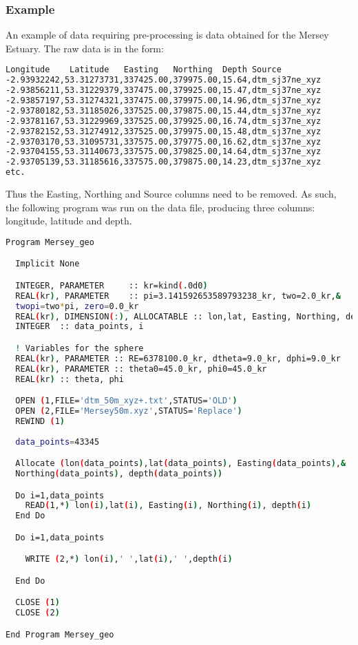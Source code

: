 \subsubsection{Example}

An example of data requiring pre-processing is data obtained for the Mersey Estuary. The raw data is in the form:
\begin{lstlisting}[language = Bash]
Longitude    Latitude   Easting   Northing  Depth Source 
-2.93932242,53.31273731,337425.00,379975.00,15.64,dtm_sj37ne_xyz 
-2.93856211,53.31229379,337475.00,379925.00,15.47,dtm_sj37ne_xyz 
-2.93857197,53.31274321,337475.00,379975.00,14.96,dtm_sj37ne_xyz 
-2.93780182,53.31185026,337525.00,379875.00,15.44,dtm_sj37ne_xyz 
-2.93781167,53.31229969,337525.00,379925.00,16.74,dtm_sj37ne_xyz 
-2.93782152,53.31274912,337525.00,379975.00,15.48,dtm_sj37ne_xyz 
-2.93703170,53.31095731,337575.00,379775.00,16.62,dtm_sj37ne_xyz 
-2.93704155,53.31140673,337575.00,379825.00,14.64,dtm_sj37ne_xyz 
-2.93705139,53.31185616,337575.00,379875.00,14.23,dtm_sj37ne_xyz
etc.
\end{lstlisting}


Thus the Easting, Northing and Source columns need to be removed. As such, the following program
was run on the data file, producing three columns: longitude, latitude and depth.

\begin{lstlisting}[language = Bash]
 Program Mersey_geo 

  Implicit None 

  INTEGER, PARAMETER     :: kr=kind(.0d0) 
  REAL(kr), PARAMETER    :: pi=3.141592653589793238_kr, two=2.0_kr,&
  twopi=two*pi, zero=0.0_kr 
  REAL(kr), DIMENSION(:), ALLOCATABLE :: lon,lat, Easting, Northing, depth 
  INTEGER  :: data_points, i 

  ! Variables for the sphere 
  REAL(kr), PARAMETER :: RE=6378100.0_kr, dtheta=9.0_kr, dphi=9.0_kr 
  REAL(kr), PARAMETER :: theta0=45.0_kr, phi0=45.0_kr 
  REAL(kr) :: theta, phi 

  OPEN (1,FILE='dtm_50m_xyz+.txt',STATUS='OLD') 
  OPEN (2,FILE='Mersey50m.xyz',STATUS='Replace') 
  REWIND (1) 
  
  data_points=43345 

  Allocate (lon(data_points),lat(data_points), Easting(data_points),&
  Northing(data_points), depth(data_points)) 

  Do i=1,data_points 
    READ(1,*) lon(i),lat(i), Easting(i), Northing(i), depth(i) 
  End Do 

  Do i=1,data_points 

    WRITE (2,*) lon(i),' ',lat(i),' ',depth(i) 

  End Do 

  CLOSE (1) 
  CLOSE (2) 

End Program Mersey_geo 
\end{lstlisting}

